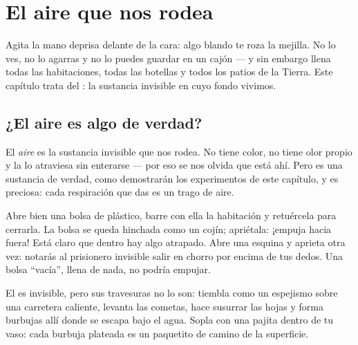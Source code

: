 \chapter{El aire que nos rodea}\label{ch:g2:air-around-us}

Agita la mano deprisa delante de la cara: algo blando te roza la
mejilla. No lo ves, no lo agarras y no lo puedes guardar en un cajón
--- y sin embargo llena todas las habitaciones, todas las botellas y
todos los patios de la Tierra. Este capítulo trata del : la
sustancia invisible en cuyo fondo vivimos.

\section{¿El aire es algo de verdad?}

\begin{definition}[El aire]\label{def:g2:air-around-us:air}
El \emph{aire} es la sustancia invisible que nos rodea. No
tiene color, no tiene olor propio y la  lo atraviesa sin
enterarse --- por eso se nos olvida que está ahí. Pero es una
sustancia de verdad, como demostrarán los experimentos de este
capítulo, y es preciosa: cada respiración que das es un trago de aire.
\end{definition}

\begin{example}\label{ex:g2:air-around-us:catch}
Abre bien una bolsa de plástico, barre con ella la habitación y
retuércela para cerrarla. La bolsa se queda hinchada como un cojín;
apriétala: ¡empuja hacia fuera! Está claro que dentro hay algo
atrapado. Abre una esquina y aprieta otra vez: notarás al prisionero
invisible salir en chorro por encima de tus dedos. Una bolsa ``vacía'',
llena de nada, no podría empujar.
\end{example}

\begin{example}\label{ex:g2:air-around-us:shows}
El  es invisible, pero sus travesuras no lo son: tiembla como un
espejismo sobre una carretera caliente, levanta las cometas, hace
susurrar las hojas y forma burbujas allí donde se escapa bajo el agua.
Sopla con una pajita dentro de tu vaso: cada burbuja plateada es un
paquetito de  camino de la superficie.
\end{example}

